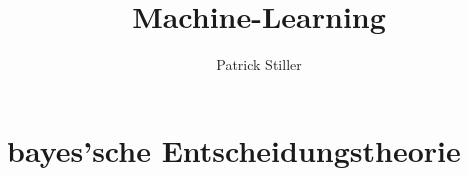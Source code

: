 \documentclass[]{article}
\author{Patrick Stiller} %
\title{Machine-Learning}
\begin{document}
\maketitle
\newpage
\tableofcontents
\newpage
\section{bayes'sche Entscheidungstheorie}

\end{document}
